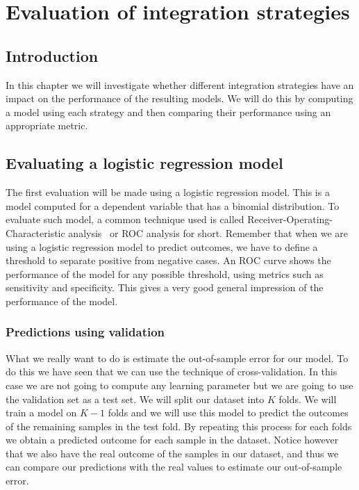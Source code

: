 \chapter{Evaluation of integration strategies}
\label{cha:evaluation}


\section{Introduction}
\label{sec:evaluation-introduction}
In this chapter we will investigate whether different integration strategies have an impact on the performance of the resulting models. We will do this by computing a model using each strategy and then comparing their performance using an appropriate metric.
\section{Evaluating a logistic regression model}
\label{sec:evaluation-logisticregression}
The first evaluation will be made using a logistic regression model. This is a model computed for a dependent variable that has a binomial distribution. To evaluate such model, a common technique used is called Receiver-Operating-Characteristic analysis~\cite{zweig1993receiver}\cite{hajian2013receiver}\cite{wikiroc} or ROC analysis for short. Remember that when we are using a logistic regression model to predict outcomes, we have to define a threshold to separate positive from negative cases. An ROC curve shows the performance of the model for any possible threshold, using metrics such as sensitivity and specificity. This gives a very good general impression of the performance of the model.
\subsection{Predictions using validation}
What we really want to do is estimate the out-of-sample error for our model. To do this we have seen that we can use the technique of cross-validation. In this case we are not going to compute any learning parameter but we are going to use the validation set as a test set. We will split our dataset into $K$ folds. We will train a model on $K-1$ folds and we will use this model to predict the outcomes of the remaining samples in the test fold. By repeating this process for each folds we obtain a predicted outcome for each sample in the dataset. Notice however that we also have the real outcome of the samples in our dataset, and thus we can compare our predictions with the real values to estimate our out-of-sample error.
